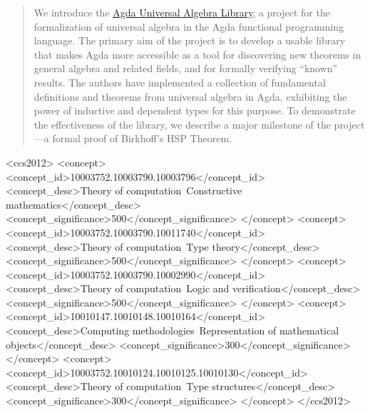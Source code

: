 \documentclass[sigplan,screen]{acmart}
\begin{document}
\begin{abstract}
We introduce the \href{anonymizedLink/agda-ualib.html}{Agda Universal Algebra Library}, a project for the formalization of universal algebra in the Agda functional programming language. The primary aim of the project is to develop a usable library that makes Agda more accessible as a tool for discovering new theorems in general algebra and related fields, and for formally verifying ``known'' results.  The authors have implemented a collection of fundamental definitions and theorems from universal algebra in Agda, exhibiting the power of inductive and dependent types for this purpose.  To demonstrate the effectiveness of the library, we describe a major milestone of the project---a formal proof of Birkhoff's HSP Theorem.
\end{abstract}

\begin{CCSXML}
<ccs2012>
   <concept>
       <concept_id>10003752.10003790.10003796</concept_id>
       <concept_desc>Theory of computation~Constructive mathematics</concept_desc>
       <concept_significance>500</concept_significance>
       </concept>
   <concept>
       <concept_id>10003752.10003790.10011740</concept_id>
       <concept_desc>Theory of computation~Type theory</concept_desc>
       <concept_significance>500</concept_significance>
       </concept>
   <concept>
       <concept_id>10003752.10003790.10002990</concept_id>
       <concept_desc>Theory of computation~Logic and verification</concept_desc>
       <concept_significance>500</concept_significance>
       </concept>
   <concept>
       <concept_id>10010147.10010148.10010164</concept_id>
       <concept_desc>Computing methodologies~Representation of mathematical objects</concept_desc>
       <concept_significance>300</concept_significance>
       </concept>
   <concept>
       <concept_id>10003752.10010124.10010125.10010130</concept_id>
       <concept_desc>Theory of computation~Type structures</concept_desc>
       <concept_significance>300</concept_significance>
       </concept>
 </ccs2012>
\end{CCSXML}
\end{document}
